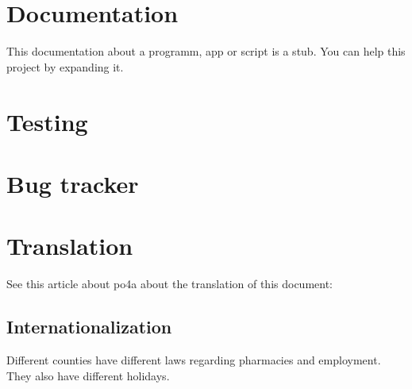 \section{Documentation}
This documentation about a programm, app or script is a stub. You can help this project by expanding it.

\section{Testing}

\section{Bug tracker}

\section{Translation}
See this article about po4a about the translation of this document:
\href{https://maltris.org/mehrsprachigkeit-fur-fast-alles-po4a-7317.html}{}

\subsection{Internationalization}
Different counties have different laws regarding pharmacies and employment. They also have different holidays.
